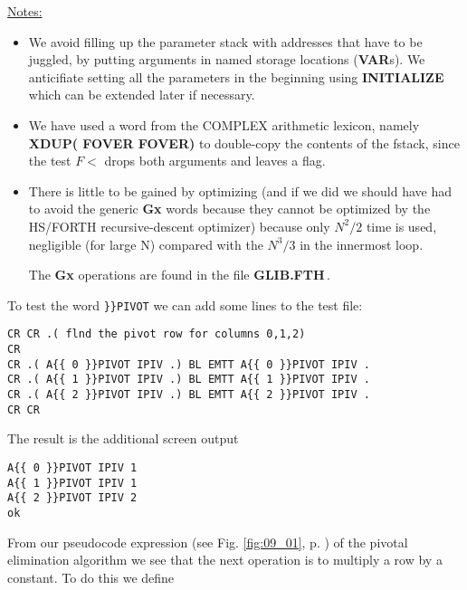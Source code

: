 \underline{Notes:}

\begin{itemize}
  \item We avoid filling up the parameter stack with addresses that have to be
      juggled, by putting arguments in named storage locations (\textbf{VAR}s).
        We anticifiate setting all the parameters in the beginning using
        \textbf{INITIALIZE} which can be extended later if necessary.
  \item We have used a word from the COMPLEX arithmetic lexicon, namely
      \textbf{XDUP( FOVER FOVER)} to double-copy the contents of the fstack,
        since the test $F<$ drops both arguments and leaves a flag.
  \item There is little to be gained by optimizing (and if we did we should
      have had to avoid the generic \textbf{Gx} words because they cannot be optimized
        by the HS/FORTH recursive-descent optimizer) because only $N^2/2$ time
        is used, negligible (for large N) compared with the $N^3/3$ in the
        innermost loop.

        The \textbf{Gx} operations are found in the file \textbf{GLIB.FTH}\,.
\end{itemize}

To test the word \verb|}}PIVOT| we can add some lines to the test file:

\begin{verbatim}
CR CR .( flnd the pivot row for columns 0,1,2)
CR
CR .( A{{ 0 }}PIVOT IPIV .) BL EMTT A{{ 0 }}PIVOT IPIV .
CR .( A{{ 1 }}PIVOT IPIV .) BL EMTT A{{ 1 }}PIVOT IPIV .
CR .( A{{ 2 }}PIVOT IPIV .) BL EMTT A{{ 2 }}PIVOT IPIV .
CR CR
\end{verbatim}
The result is the additional screen output

\begin{verbatim}
A{{ 0 }}PIVOT IPIV 1
A{{ 1 }}PIVOT IPIV 1
A{{ 2 }}PIVOT IPIV 2
ok
\end{verbatim}

From our pseudocode expression (see Fig. \ref{fig:09_01}, p. \pageref{fig:09_01}) of the
pivotal elimination algorithm we see that the next operation is to
multiply a row by a constant. To do this we define

